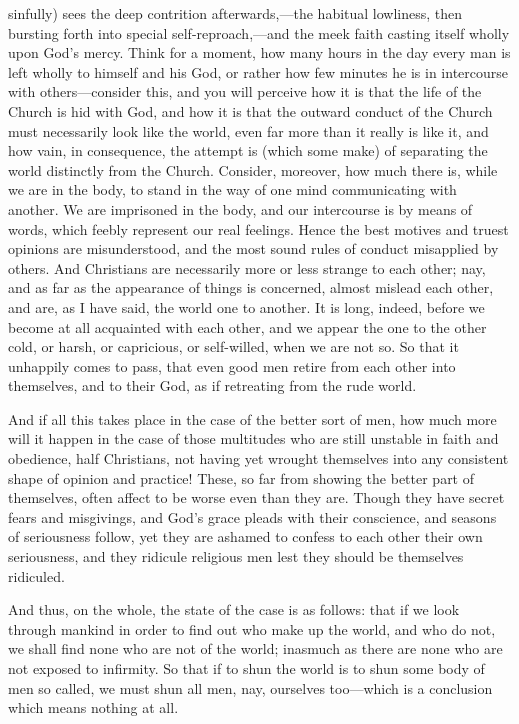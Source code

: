 sinfully) sees the deep contrition afterwards,—the habitual
lowliness, then bursting forth into special self-reproach,—and the
meek faith casting itself wholly upon God's mercy. Think for a moment,
how many hours in the day every man is left wholly to himself and his
God, or rather how few minutes he is in intercourse with others—consider
this, and you will perceive how it is that the life of the Church is
hid with God, and how it is that the outward conduct of the Church
must necessarily look like the world, even far more than it really is
like it, and how vain, in consequence, the attempt is (which some
make) of separating the world distinctly from the Church. Consider,
moreover, how much there is, while we are in the body, to stand in the
way of one mind communicating with another. We are imprisoned in the
body, and our intercourse is by means of words, which feebly represent
our real feelings. Hence the best motives and truest opinions are
misunderstood, and the most sound rules of conduct misapplied by
others. And Christians are necessarily more or less strange to each
other; nay, and as far as the appearance of things is concerned,
almost mislead each other, and are, as I have said, the world one to
another. It is long, indeed, before we become at all acquainted with
each other, and we appear the one to the other cold, or harsh, or
capricious, or self-willed, when we are not so. So that it unhappily
comes to pass, that even good men retire from each other into
themselves, and to their God, as if retreating from the rude world.

And if all this takes place in the case of the better sort of men,
how much more will it happen in the case of those multitudes who are
still unstable in faith and obedience, half Christians, not having yet
wrought themselves into any consistent shape of opinion and practice!
These, so far from showing the better part of themselves, often affect
to be worse even than they are. Though they have secret fears and
misgivings, and God's grace pleads with their conscience, and seasons
of seriousness follow, yet they are ashamed to confess to each other
their own seriousness, and they ridicule religious men lest they
should be themselves ridiculed.

And thus, on the whole, the state of the case is as follows: that
if we look through mankind in order to find out who make up the world,
and who do not, we shall find none who are not of the world; inasmuch
as there are none who are not exposed to infirmity. So that if to shun
the world is to shun some body of men so called, we must shun all men,
nay, ourselves too—which is a conclusion which means nothing at all.


